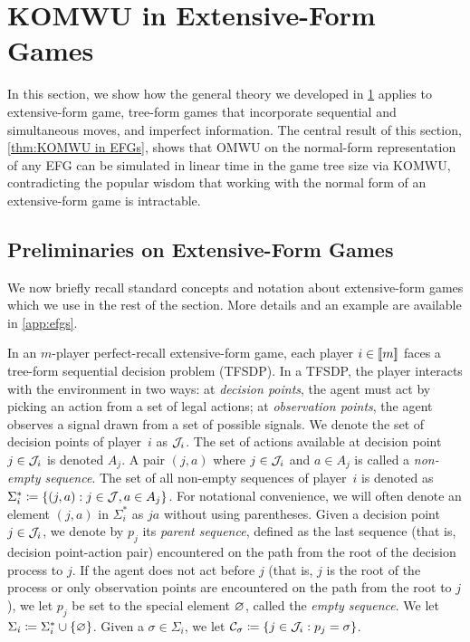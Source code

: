 \section{KOMWU in Extensive-Form Games}\label{sec:kernel efgs}

In this section, we show how the general theory we developed in \cref{sec:kernel efgs}
applies to extensive-form game, \ie tree-form games that incorporate sequential and simultaneous moves, and imperfect information. The central result of this section, \cref{thm:KOMWU in EFGs}, shows that OMWU on the normal-form representation of any EFG can be simulated in linear time in the game tree size via KOMWU, contradicting the popular wisdom that working with the normal form of an extensive-form game is intractable.

\subsection{Preliminaries on Extensive-Form Games}\label{sec:efg notation}

We now briefly recall standard concepts and notation about extensive-form games which we use in the rest of the section. More details and an example are available in \cref{app:efgs}.

In an $m$-player perfect-recall extensive-form game, each player $i\in[\![m]\!]$ faces a tree-form sequential decision problem (TFSDP). In a TFSDP, the player interacts with the environment in two ways: at \emph{decision points}, the
agent must act by picking an action from a set of legal actions; at
\emph{observation points}, the agent observes a signal drawn from a set of
possible signals. We denote the set of decision points of player~$i$ as ${\mathcal{J}}_i$. The set of actions available at decision point $j\in{\mathcal{J}}_i$ is denoted $A_j$. A pair $(j,a)$ where $j\in {\mathcal{J}}_i$ and $a \in A_j$ is called a \emph{non-empty sequence}. The set of all non-empty sequences of player~$i$ is denoted as $\Sigma^*_i \coloneqq \{(j,a): j\in{\mathcal{J}}, a\in A_j\}$.
For notational convenience, we will often denote an element $(j,a)$ in
$\Sigma_i^*$ as $ja$ without using parentheses. Given a decision point $j \in {\mathcal{J}}_i$, we denote by $p_j$ its
\emph{parent sequence}, defined as the last sequence (that is, decision
point-action pair) encountered on the path from the root of the
decision process to $j$.
If the agent does not act before $j$ (that is, $j$ is the root of the
process or only observation points are encountered on the path from
the root to $j$), we let $p_j$ be set to the special element $\varnothing$, called the \emph{empty sequence}. We let $\Sigma_i \coloneqq \Sigma_i^* \cup \{\varnothing\}$. Given a $\sigma \in \Sigma_i$, we let $\mathcal{C}_\sigma \coloneqq \{j\in{\mathcal{J}}_i: p_j = \sigma\}$.


